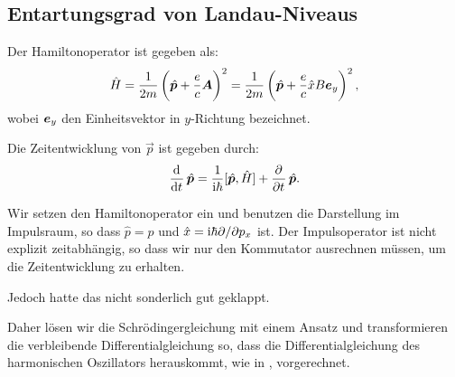 \subsection{Entartungsgrad von Landau-Niveaus}

Der Hamiltonoperator ist gegeben als:
\[
    \hat H = \frac1{2m} \del{\hat{\vec p} + \frac ec \vec A}^2
    = \frac1{2m} \del{\hat{\vec p} + \frac ec \hat x B \ev_y}^2,
\]
wobei $\boldsymbol{e}_y$ den Einheitsvektor in $y$-Richtung bezeichnet.

Die Zeitentwicklung von $\vec p$ ist gegeben durch:
\[
    \dod{}t \hat{\vec p} = \frac1{\iup\hbar} [\hat{\vec p}, \hat H] + \dpd{}t \hat{\vec p}.
\]

Wir setzen den Hamiltonoperator ein und benutzen die Darstellung im Impulsraum,
so dass $\hat p = p$ und $\hat x = \mathrm i\hbar \partial/\partial p_x$ ist. Der
Impulsoperator ist nicht explizit zeitabhängig, so dass wir nur den Kommutator
ausrechnen müssen, um die Zeitentwicklung zu erhalten.

Jedoch hatte das nicht sonderlich gut geklappt.

Daher lösen wir die Schrödingergleichung mit einem Ansatz und transformieren
die verbleibende Differentialgleichung so, dass die Differentialgleichung des
harmonischen Oszillators herauskommt, wie in
\cite[Abschnitt~3.2.7]{nolting-theo6}, vorgerechnet.


